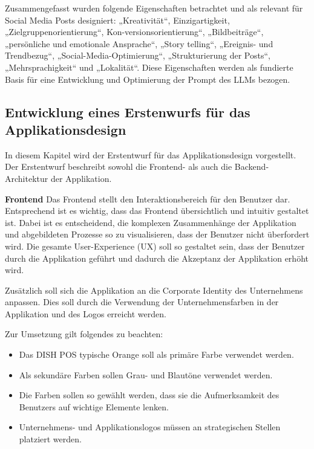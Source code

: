 Zusammengefasst wurden folgende Eigenschaften betrachtet und als relevant für Social Media Posts designiert: „Kreativität“, Einzigartigkeit, „Zielgruppenorientierung“, Kon-versionsorientierung“, „Bildbeiträge“, „persönliche und emotionale Ansprache“, „Story telling“, „Ereignis- und Trendbezug“, „Social-Media-Optimierung“, „Strukturierung der Posts“, „Mehrsprachigkeit“ und „Lokalität“.
Diese Eigenschaften werden als fundierte Basis für eine Entwicklung und Optimierung der Prompt des LLMs bezogen.

\subsection{Entwicklung eines Erstenwurfs für das Applikationsdesign}\label{subsec:entwicklung-eines-erstenwurfs-fuer-das-applikationsdesign}
In diesem Kapitel wird der Erstentwurf für das Applikationsdesign vorgestellt.
Der Erstentwurf beschreibt sowohl die Frontend- als auch die Backend-Architektur der Applikation.

\textbf{Frontend}\newline
Das Frontend stellt den Interaktionsbereich für den Benutzer dar.
Entsprechend ist es wichtig, dass das Frontend übersichtlich und intuitiv gestaltet ist.
Dabei ist es entscheidend, die komplexen Zusammenhänge der Applikation und abgebildeten Prozesse so zu visualisieren, dass der Benutzer nicht überfordert wird.
Die gesamte User-Experience (UX) soll so gestaltet sein, dass der Benutzer durch die Applikation geführt und dadurch die Akzeptanz der Applikation erhöht wird.

Zusätzlich soll sich die Applikation an die Corporate Identity des Unternehmens anpassen.
Dies soll durch die Verwendung der Unternehmensfarben in der Applikation und des Logos erreicht werden.

Zur Umsetzung gilt folgendes zu beachten:
\begin{itemize}
    \item Das DISH POS typische Orange soll als primäre Farbe verwendet werden.
    \item Als sekundäre Farben sollen Grau- und Blautöne verwendet werden.
    \item Die Farben sollen so gewählt werden, dass sie die Aufmerksamkeit des Benutzers auf wichtige Elemente lenken.
    \item Unternehmens- und Applikationslogos müssen an strategischen Stellen platziert werden.
\end{itemize}
\newpage

